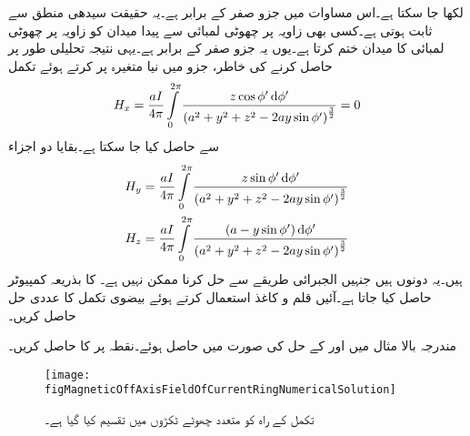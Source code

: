 لکھا جا سکتا ہے۔اس مساوات میں  جزو صفر کے برابر ہے۔یہ حقیقت سیدھی منطق سے ثابت ہوتی ہے۔کسی بھی زاویہ  پر چھوٹی لمبائی سے پیدا میدان کو زاویہ  پر چھوٹی لمبائی کا میدان ختم کرتا ہے۔یوں یہ جزو صفر کے برابر ہے۔یہی نتیجہ تحلیلی طور پر حاصل کرنے کی خاطر،  جزو میں نیا متغیرہ
  پر کرتے ہوئے تکمل
\begin{align*}
H_x=\frac{a I}{4\pi}\int \limits_{0}^{2\pi} \frac{z\cos \phi' \dif \phi'}{\left(a^2+y^2+z^2-2 a y\sin \phi'\right)^{\frac{3}{2}}}=0
\end{align*}
سے حاصل کیا جا سکتا ہے۔بقایا دو اجزاء
\begin{gather}
\begin{aligned}\label{مساوات_مقناطیسی_دائرے_کا_محور_سے_دور_اجزاء}
H_y&=\frac{aI}{4\pi}\int\limits_0^{2\pi} \frac{z\sin \phi' \dif \phi'}{\left(a^2+y^2+z^2-2 a y\sin \phi'\right)^{\frac{3}{2}}}\\
H_z&=\frac{a I}{4\pi}\int \limits_{0}^{2\pi} \frac{(a-y\sin\phi') \dif \phi'}{\left(a^2+y^2+z^2-2 a y\sin \phi'\right)^{\frac{3}{2}}} 
\end{aligned}
\end{gather}
ہیں۔یہ دونوں  ہیں جنہیں الجبرائی طریقے سے حل کرنا ممکن نہیں ہے۔
 کا  بذریعہ کمپیوٹر حاصل کیا جاتا ہے۔آئیں قلم و کاغذ استعمال کرتے ہوئے بیضوی تکمل کا عددی حل حاصل کریں۔

مندرجہ بالا مثال میں  اور  کے حل    کی صورت میں حاصل ہوئے۔نقطہ  پر  کا  حاصل کریں۔
\begin{figure}
\centering
\texttt{[image: figMagneticOffAxisFieldOfCurrentRingNumericalSolution]}
\caption{تکمل کے راہ کو متعدد چھوٹے ٹکڑوں میں تقسیم کیا گیا ہے۔}
\label{شکل_مقناطیسی_عددی_حل_دائرہ_برقی_رو}
\end{figure}

